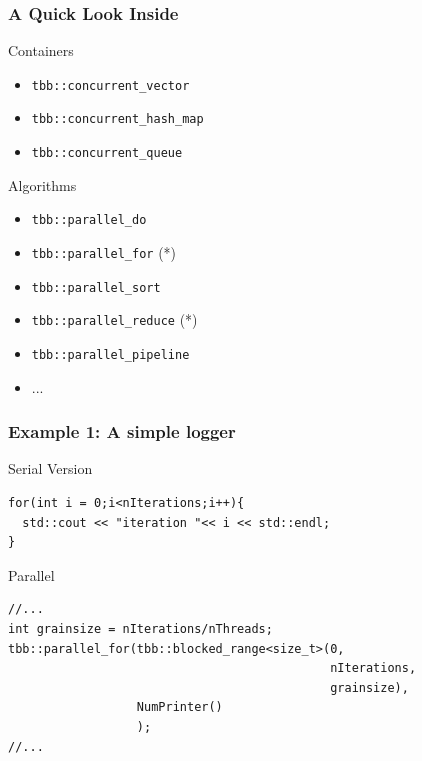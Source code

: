 \documentclass[9pt,pdftex]{beamer}
\begin{document}
\begin{frame}
  \frametitle{A Quick Look Inside}
  \begin{block}{Containers}
    \begin{itemize}
    \item \texttt{tbb::concurrent\_vector}
    \item \texttt{tbb::concurrent\_hash\_map}
    \item \texttt{tbb::concurrent\_queue}
    \end{itemize}
  \end{block}

  \begin{block}{Algorithms}
    \begin{itemize}
    \item \texttt{tbb::parallel\_do}
    \item \texttt{tbb::parallel\_for} (*)
    \item \texttt{tbb::parallel\_sort}
    \item \texttt{tbb::parallel\_reduce} (*)
    \item \texttt{tbb::parallel\_pipeline}
    \item ...
    \end{itemize}
  \end{block}
  
\end{frame}

\begin{frame}[fragile]
  \frametitle{Example 1: A simple logger}
  \begin{block}{Serial Version}
    \small
    \begin{lstlisting}[]
for(int i = 0;i<nIterations;i++){ 
  std::cout << "iteration "<< i << std::endl; 
}
    \end{lstlisting}
  \end{block}
\pause
   \vfill
   \begin{block}{Parallel}
     \small
     \begin{lstlisting}[]
//...  
int grainsize = nIterations/nThreads;
tbb::parallel_for(tbb::blocked_range<size_t>(0, 
                                             nIterations,
                                             grainsize), 
                  NumPrinter() 
                  ); 
//...
     \end{lstlisting}
   \end{block}

\end{frame}
\end{document}
